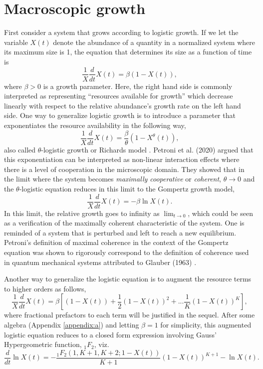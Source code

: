 \documentclass{article}
\begin{document}
\section{Macroscopic growth}
\label{sec:macro}

First consider a system that grows according to logistic growth. If we let the variable $X(t)$ denote the abundance of a quantity in a normalized system where its maximum size is 1, the equation that determines its size as a function of time is
\begin{equation}
  \frac{1}{X}\frac{d}{dt} X(t) = \beta (1 - X(t)),
\end{equation}
where $\beta>0$ is a growth parameter. Here, the right hand side is commonly interpreted as representing ``resources available for growth'' which decrease linearly with respect to the relative abundance's growth rate on the left hand side. One way to generalize logistic growth is to introduce a parameter that exponentiates the resource availability in the following way,
\begin{equation}
\label{eq:Rich}
  \frac{1}{X}\frac{d}{dt} X(t) = \frac{\beta}{\theta} (1 - X^{\theta}(t)),
\end{equation}
also called $\theta$-logistic growth or Richards model \citep{richards1959flexible}. Petroni et al. (2020) argued that this exponentiation can be interpreted as non-linear interaction effects where there is a level of cooperation in the microscopic domain. They showed that in the limit where the system becomes \textit{maximally cooperative} or \textit{coherent}, $\theta\rightarrow 0$ and the $\theta$-logistic equation reduces in this limit to the Gompertz growth model,
 \begin{equation}
 \label{eq:Gomp}
  \frac{1}{X}\frac{d}{dt} X(t) = - \beta \ln X(t).
\end{equation}
In this limit, the relative growth goes to infinity as $\lim_{t\to 0}$, which could be seen as a verification of the maximally coherent characteristic of the system. One is reminded of a system that is perturbed and left to reach a new equilibrium. Petroni's definition of maximal coherence in the context of the Gompertz equation was shown to rigorously correspond to the definition of coherence used in quantum mechanical systems \cite{molski2003coherent} attributed to Glauber (1963) \cite{glauber1963coherent}.

Another way to generalize the logistic equation is to augment the resource terms to higher orders as follows,
\begin{equation}
  \frac{1}{X}\frac{d}{dt} X(t) = \beta \left[(1 - X(t)) + \frac{1}{2}(1 - X(t))^2 + ... \frac{1}{K}(1 - X(t))^K\right],
\end{equation}
where fractional prefactors to each term will be justified in the sequel.
After some algebra (Appendix \ref{appendix:a}) and letting $\beta=1$ for simplicity, this augmented logistic equation reduces to a closed form expression involving Gauss' Hypergeometric function, ${}_1F_{2}$, viz.
\begin{equation}
 \label{eq:modLogistic}
\frac{d}{dt}\ln{X(t)} = - \frac{{}_{1}F_{2}({1,K+1,K+2;1-X(t)})}{K+1}(1-X(t))^{K+1} - \ln{X(t)}.
 \end{equation}
\end{document}
